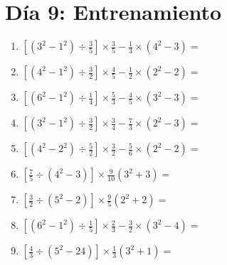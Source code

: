 \documentclass[12pt]{article}
\begin{document}
\section*{Día 9: Entrenamiento}
\begin{enumerate}[ itemsep=1.5cm]
	\item $\displaystyle \left[ \left( 3^2 - 1^2 \right) \div \frac{3}{5} \right] \times \frac{3}{5} - \frac{1}{3} \times \left( 4^2 - 3 \right) =$
	\item $\displaystyle \left[ \left( 4^2 - 1^2 \right) \div \frac{3}{2} \right] \times \frac{4}{5} - \frac{1}{2} \times \left( 2^2 - 2 \right) =$
	\item $\displaystyle \left[ \left( 6^2 - 1^2 \right) \div \frac{1}{4} \right] \times \frac{5}{3} - \frac{4}{5} \times \left( 3^2 - 3 \right) =$
	\item $\displaystyle \left[ \left( 3^2 - 1^2 \right) \div \frac{3}{2} \right] \times \frac{3}{4} - \frac{7}{3} \times \left( 2^2 - 3 \right) =$
	\item $\displaystyle \left[ \left( 4^2 - 2^2 \right) \div \frac{5}{2} \right] \times \frac{3}{2} - \frac{5}{6} \times \left( 2^2 - 2 \right) =$
	\item $\displaystyle \left[ \frac{7}{5} \div \left( 4^2 - 3 \right) \right] \times \frac{9}{10} \left( 3^2 + 3 \right) =$
	\item $\displaystyle \left[ \frac{3}{2} \div \left( 5^2 - 2 \right) \right] \times \frac{9}{5} \left( 2^2 + 2 \right) =$
	\item $\displaystyle \left[ \left( 6^2 - 1^2 \right) \div \frac{1}{5} \right] \times \frac{2}{3} - \frac{3}{2} \times \left( 3^2 - 4 \right) =$
	\item $\displaystyle \left[ \frac{4}{3} \div \left( 5^2 - 24 \right) \right] \times \frac{1}{3} \left( 3^2 + 1 \right) =$


\end{enumerate}
\end{document}
